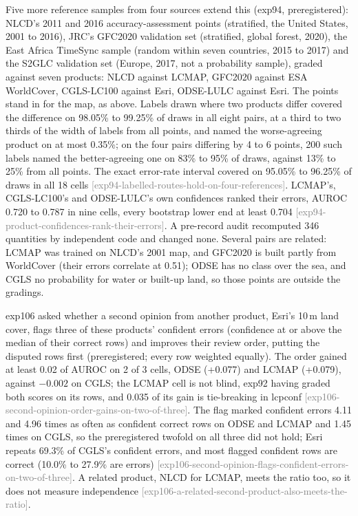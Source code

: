\documentclass[11pt,a4paper]{article}
\newcommand{\claim}[1]{{\scriptsize\textsf{\textcolor{gray}{[#1]}}}}
\begin{document}
Five more reference samples from four sources extend this (exp94, preregistered): NLCD's 2011 and 2016
accuracy-assessment points (stratified, the United States, 2001 to 2016), JRC's GFC2020 validation set (stratified,
global forest, 2020), the East Africa TimeSync sample (random within seven countries, 2015 to 2017) and the S2GLC
validation set (Europe, 2017, not a probability sample), graded against seven products: NLCD against LCMAP, GFC2020
against ESA WorldCover, CGLS-LC100 against Esri, ODSE-LULC against Esri. The points stand in for the map, as above.
Labels drawn where two products differ covered the difference on 98.05\% to 99.25\% of draws in all eight pairs, at a
third to two thirds of the width of labels from all points, and named the worse-agreeing product on at most 0.35\%;
on the four pairs differing by 4 to 6 points, 200 such labels named the better-agreeing one on 83\% to 95\% of
draws, against 13\% to 25\% from all points. The exact error-rate interval covered on 95.05\% to 96.25\% of draws in
all 18 cells \claim{exp94-labelled-routes-hold-on-four-references}. LCMAP's, CGLS-LC100's and ODSE-LULC's own
confidences ranked their errors, AUROC 0.720 to 0.787 in nine cells, every bootstrap lower end at least 0.704
\claim{exp94-product-confidences-rank-their-errors}. A pre-record audit recomputed 346 quantities by independent code
and changed none. Several pairs are related: LCMAP was trained on NLCD's 2001 map, and GFC2020 is built partly from
WorldCover (their errors correlate at 0.51); ODSE has no class over the sea, and CGLS no probability for water or
built-up land, so those points are outside the gradings.

exp106 asked whether a second opinion from another product, Esri's 10\,m land cover, flags three of these products'
confident errors (confidence at or above the median of their correct rows) and improves their review order, putting
the disputed rows first (preregistered; every row weighted equally). The order gained at least 0.02 of AUROC on 2 of 3
cells, ODSE (+0.077) and LCMAP (+0.079), against $-0.002$ on CGLS; the LCMAP cell is not blind, exp92 having graded both
scores on its rows, and 0.035 of its gain is tie-breaking in lcpconf \claim{exp106-second-opinion-order-gains-on-two-of-three}.
The flag marked confident errors 4.11 and 4.96 times as often as confident correct rows on ODSE and LCMAP and 1.45 times
on CGLS, so the preregistered twofold on all three did not hold; Esri repeats 69.3\% of CGLS's confident errors, and
most flagged confident rows are correct (10.0\% to 27.9\% are errors)
\claim{exp106-second-opinion-flags-confident-errors-on-two-of-three}. A related product, NLCD for LCMAP, meets the
ratio too, so it does not measure independence \claim{exp106-a-related-second-product-also-meets-the-ratio}.
\end{document}
